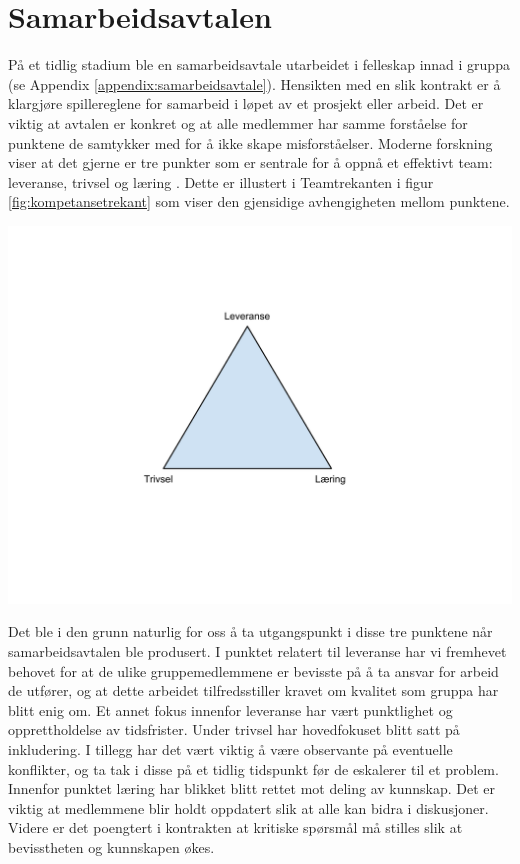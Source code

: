 \section{Samarbeidsavtalen}
På et tidlig stadium ble en samarbeidsavtale utarbeidet i felleskap innad i gruppa (se Appendix \ref{appendix:samarbeidsavtale}). Hensikten med en slik kontrakt er å klargjøre spillereglene for samarbeid i løpet av et prosjekt eller arbeid. Det er viktig at avtalen er konkret og at alle medlemmer har samme forståelse for punktene de samtykker med for å ikke skape misforståelser. Moderne forskning viser at det gjerne er tre punkter som er sentrale for å oppnå et effektivt team: leveranse, trivsel og læring \citep{hjerto}. Dette er illustert i Teamtrekanten i figur \ref{fig:kompetansetrekant} som viser den gjensidige avhengigheten mellom punktene.\\

\begin{center}
\includegraphics[clip=true, width=1 \textwidth,
trim=0cm 5cm 0cm 3cm]{kompetansetrekant.pdf}
\label{fig:kompetansetrekant}
\end{center}

Det ble i den grunn naturlig for oss å ta utgangspunkt i disse tre punktene når samarbeidsavtalen ble produsert. I punktet relatert til leveranse har vi fremhevet behovet for at de ulike gruppemedlemmene er bevisste på å ta ansvar for arbeid de utfører, og at dette arbeidet tilfredsstiller kravet om kvalitet som gruppa har blitt enig om. Et annet fokus innenfor leveranse har vært punktlighet og opprettholdelse av tidsfrister. Under trivsel har hovedfokuset blitt satt på inkludering. I tillegg har det vært viktig å være observante på eventuelle konflikter, og ta tak i disse på et tidlig tidspunkt før de eskalerer til et problem. Innenfor punktet læring har blikket blitt rettet mot deling av kunnskap. Det er viktig at medlemmene blir holdt oppdatert slik at alle kan bidra i diskusjoner. Videre er det poengtert i kontrakten at kritiske spørsmål må stilles slik at bevisstheten og kunnskapen økes.\\

